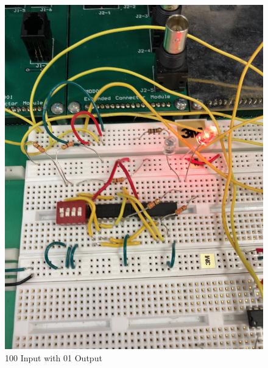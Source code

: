 \documentclass[10pt]{article}
\begin{document}
\begin{centering}
	\begin{figure} [H]
		\centering
		\includegraphics[scale=0.07]{images/100led.jpg}
		\caption{100 Input with 01 Output}
	\end{figure}
\end{centering}
\end{document}
